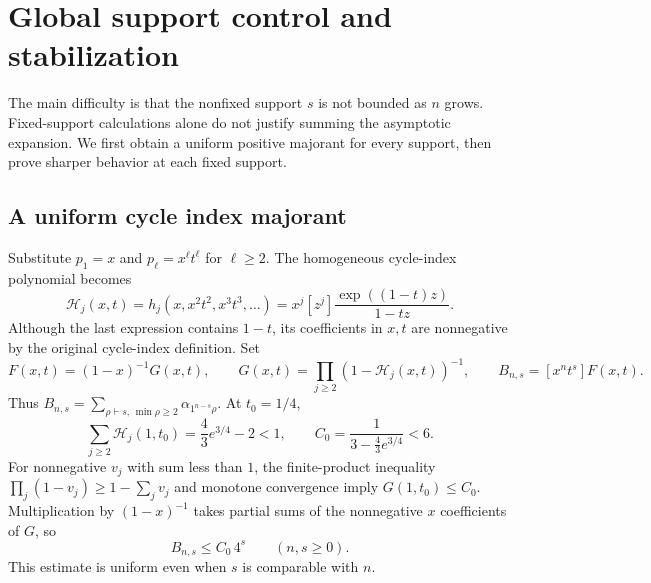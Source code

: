 \section{Global support control and stabilization}\label{tks:sec:support}
The main difficulty is that the nonfixed support $s$ is not bounded as $n$ grows. Fixed-support calculations alone do not justify summing the asymptotic expansion. We first obtain a uniform positive majorant for every support, then prove sharper behavior at each fixed support.

\subsection{A uniform cycle index majorant}
Substitute $p_1=x$ and $p_\ell=x^\ell t^\ell$ for $\ell\geq2$. The homogeneous cycle-index polynomial becomes
\begin{equation}\label{tks:eq:Hjt}
\mathcal H_j(x,t)=h_j(x,x^2t^2,x^3t^3,\ldots)
 =x^j[z^j]\frac{\exp((1-t)z)}{1-tz}.
\end{equation}
Although the last expression contains $1-t$, its coefficients in $x,t$ are nonnegative by the original cycle-index definition. Set
\[
F(x,t)=(1-x)^{-1}G(x,t),\qquad
G(x,t)=\prod_{j\geq2}(1-\mathcal H_j(x,t))^{-1},
\qquad B_{n,s}=[x^nt^s]F(x,t).
\]
Thus $B_{n,s}=\sum_{\rho\vdash s,\,\min\rho\geq2}\alpha_{1^{n-s}\rho}$.
At $t_0=1/4$,
\begin{equation}\label{tks:eq:C0}
\sum_{j\geq2}\mathcal H_j(1,t_0)=\frac43e^{3/4}-2<1,
\qquad
C_0=\frac1{3-\frac43e^{3/4}}<6.
\end{equation}
For nonnegative $v_j$ with sum less than $1$, the finite-product inequality
$\prod_j(1-v_j)\geq1-\sum_jv_j$ and monotone convergence imply
$G(1,t_0)\leq C_0$. Multiplication by $(1-x)^{-1}$ takes partial sums of the nonnegative $x$ coefficients of $G$, so
\begin{equation}\label{tks:eq:Bns}
B_{n,s}\leq C_0\,4^s\qquad(n,s\geq0).
\end{equation}
This estimate is uniform even when $s$ is comparable with $n$.

